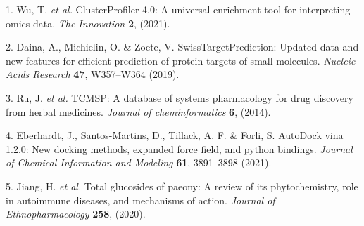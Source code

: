\documentclass[
]{article}
\newenvironment{cslreferences}%
  {}%
  {\par}
\begin{document}
\hypertarget{refs}{}
\begin{cslreferences}
\leavevmode\hypertarget{ref-ClusterprofilerWuTi2021}{}%
1. Wu, T. \emph{et al.} ClusterProfiler 4.0: A universal enrichment tool for interpreting omics data. \emph{The Innovation} \textbf{2}, (2021).

\leavevmode\hypertarget{ref-SwisstargetpredDaina2019}{}%
2. Daina, A., Michielin, O. \& Zoete, V. SwissTargetPrediction: Updated data and new features for efficient prediction of protein targets of small molecules. \emph{Nucleic Acids Research} \textbf{47}, W357--W364 (2019).

\leavevmode\hypertarget{ref-TcmspADatabaRuJi2014}{}%
3. Ru, J. \emph{et al.} TCMSP: A database of systems pharmacology for drug discovery from herbal medicines. \emph{Journal of cheminformatics} \textbf{6}, (2014).

\leavevmode\hypertarget{ref-AutodockVina1Eberha2021}{}%
4. Eberhardt, J., Santos-Martins, D., Tillack, A. F. \& Forli, S. AutoDock vina 1.2.0: New docking methods, expanded force field, and python bindings. \emph{Journal of Chemical Information and Modeling} \textbf{61}, 3891--3898 (2021).

\leavevmode\hypertarget{ref-TotalGlucosideJiang2020}{}%
5. Jiang, H. \emph{et al.} Total glucosides of paeony: A review of its phytochemistry, role in autoimmune diseases, and mechanisms of action. \emph{Journal of Ethnopharmacology} \textbf{258}, (2020).
\end{cslreferences}
\end{document}
